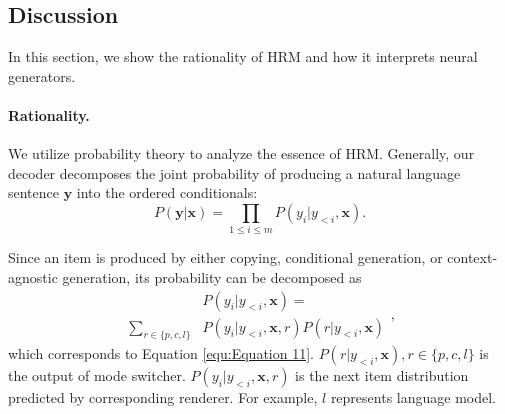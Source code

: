 \documentclass[letterpaper]{article} %
\begin{document}
\subsection{Discussion}
\label{sec:Discussion}

In this section, we show the rationality of HRM and how it interprets neural generators.

\paragraph{Rationality.} We utilize probability theory to analyze the essence of HRM. Generally, our decoder decomposes the joint probability of producing a natural language sentence $\mathbf{y}$ into the ordered conditionals:
\begin{equation}
P(\mathbf{y} | \mathbf{x}) = \prod_{1 \le i \le m} P(y_i | y_{<i}, \mathbf{x}).
\end{equation}

Since an item is produced by either copying, conditional generation, or context-agnostic generation, its probability can be decomposed as
\begin{equation}
\label{equ:Equation 17}
\begin{aligned}
& P(y_i | y_{<i}, \mathbf{x})  = \\
\sum_{r \in \{p, c, l\}} & P(y_i | y_{<i}, \mathbf{x}, r) P(r | y_{<i}, \mathbf{x})
\end{aligned},
\end{equation}
which corresponds to Equation \ref{equ:Equation 11}. $P(r | y_{<i}, \mathbf{x}), r \in \{p, c, l\}$ is the output of mode switcher. $P(y_i | y_{<i}, \mathbf{x}, r)$ is the next item distribution predicted by corresponding renderer. For example, $l$ represents language model.
\end{document}
